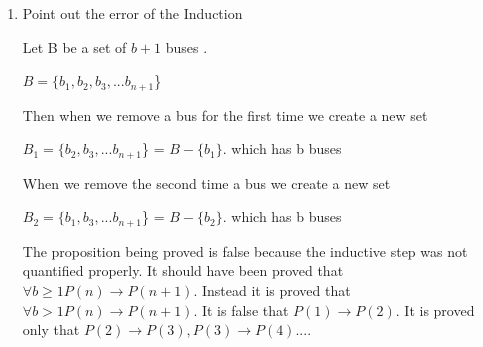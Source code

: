 \documentclass[11pt]{article}
\begin{document}
\begin{enumerate}
\begin{proof}
\begin{enumerate}
 

\end{enumerate}

\end{proof}


\item Point out the error of the Induction 
\bigskip

Let B be a set of $b+1$ buses .
\bigskip

$B = \{b_1, b_2, b_3,  ... b_{n+1}$\}
\bigskip

Then when we remove a bus for the first time  we create a new set 
\bigskip

$B_1 =  \{ b_2, b_3,  ... b_{n+1}$\} = $B- \{b_1\}.$  which has b buses
\bigskip

When we remove the second time a bus we create a new set 
\bigskip

$B_2 =  \{ b_1, b_3,  ... b_{n+1}$\} = $B- \{b_2\}.$  which has b buses
\bigskip


The proposition being proved is false because the inductive step was not quantified properly. It should have been proved that $\forall b \geq 1  P(n) \rightarrow P(n+1)$. Instead it is proved that $\forall  b > 1 P(n) \rightarrow P(n+1)$. It is false that $P(1) \rightarrow P(2)$. It is proved only that $P(2) \rightarrow P(3), P(3) \rightarrow P(4)...$.

\end{enumerate}
\end{document}
